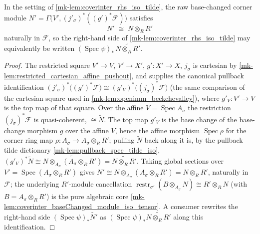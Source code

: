 \begin{lemma}\label{mk-lem:coverinter_rhs_tensor_rewrite}
  \leanok

  In the setting of \ref{mk-lem:coverinter_rhs_iso_tilde}, the raw base-changed corner module
  \(N' = \Gamma\bigl(V', (j'_\sigma)^*((g')^*\mathcal{F})\bigr)\) satisfies
  \[
    N' \;\cong\; N \otimes_R R'
  \]
  naturally in \(\mathcal{F}\), so the right-hand side of
  \ref{mk-lem:coverinter_rhs_iso_tilde} may equivalently be written
  \((\operatorname{Spec}\psi)_*\,\widetilde{N \otimes_R R'}\).
\end{lemma}
\begin{proof}
  \leanok
  The restricted square
  \(V' \to V\), \(V' \to X'\), \(g' : X' \to X\), \(j_\sigma\) is cartesian by
  \ref{mk-lem:restricted_cartesian_affine_pushout}, and supplies the canonical pullback
  identification \((j'_\sigma)^*\bigl((g')^*\mathcal{F}\bigr) \cong
  (g'_V)^*\bigl((j_\sigma)^*\mathcal{F}\bigr)\) (the same comparison of the cartesian square used
  in \ref{mk-lem:openimm_beckchevalley}), where \(g'_V : V' \to V\) is the top map of that square.
  Over the affine \(V = \operatorname{Spec} A_\sigma\) the restriction \((j_\sigma)^*\mathcal{F}\)
  is quasi-coherent, \(\cong \widetilde{N}\). The top map \(g'_V\) is the base change of the
  base-change morphism \(g\) over the affine \(V\), hence the affine morphism
  \(\operatorname{Spec}\rho\) for the corner ring map \(\rho : A_\sigma \to A_\sigma \otimes_R R'\);
  pulling \(\widetilde{N}\) back along it is, by the pullback tilde dictionary
  \ref{mk-lem:pullback_spec_tilde_iso},
  \((g'_V)^*\widetilde{N} \cong \widetilde{N \otimes_{A_\sigma}(A_\sigma \otimes_R R')}
  = \widetilde{N \otimes_R R'}\). Taking global sections over
  \(V' = \operatorname{Spec}(A_\sigma \otimes_R R')\) gives
  \(N' \cong N \otimes_{A_\sigma}(A_\sigma \otimes_R R') = N \otimes_R R'\), naturally in
  \(\mathcal{F}\); the underlying \(R'\)-module cancellation
  \(\operatorname{restr}_{\sigma'}(B \otimes_{A_\sigma} N) \cong R' \otimes_R N\) (with
  \(B = A_\sigma \otimes_R R'\)) is the pure algebraic core
  \ref{mk-lem:coverinter_baseChanged_module_iso_tensor}. A consumer rewrites the right-hand side
  \((\operatorname{Spec}\psi)_*\widetilde{N'}\) as
  \((\operatorname{Spec}\psi)_*\widetilde{N \otimes_R R'}\) along this identification.
\end{proof}

